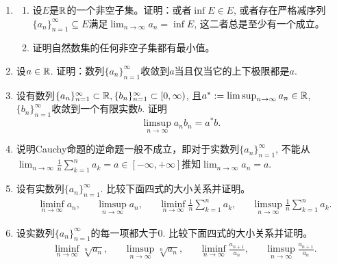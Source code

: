 \begin{enumerate}
    \item \begin{enumerate}
        \item 设$E$是$\mathbb{R}$的一个非空子集。证明：或者$\inf E\in E$, 或者存在严格减序列$\{a_n\}_{n=1}^\infty\subseteq E$满足$\lim_{n\to\infty}a_n=\inf E$, 这二者总是至少有一个成立。
        \item 证明自然数集的任何非空子集都有最小值。
    \end{enumerate}
    \item 设$a\in \mathbb{R}$. 证明：数列$\{a_n\}_{n=1}^\infty$收敛到$a$当且仅当它的上下极限都是$a$.
    \item 设有数列$\{a_n\}_{n=1}^\infty\subset \mathbb{R},\{b_n\}_{n=1}^\infty\subset [0,\infty)$, 且$a^*:=\limsup_{n\to \infty}a_n\in \mathbb{R}$, $\{b_n\}_{n=1}^\infty$收敛到一个有限实数$b$. 证明\begin{equation*}
        \limsup_{n\to\infty} a_nb_n=a^*b.
    \end{equation*}
    \item 说明Cauchy命题的逆命题一般不成立，即对于实数列$\{a_n\}_{n=1}^\infty$, 不能从$\lim_{n\to\infty}\frac{1}{n}\sum_{k=1}^{n}a_k=a\in [-\infty,+\infty]$推知$\lim_{n\to\infty}a_n=a$.
    \item 设有实数列$\{a_n\}_{n=1}^\infty$. 比较下面四式的大小关系并证明。\begin{align*}
        &\liminf_{n\to\infty}a_n,
        &&\limsup_{n\to\infty}a_n,
        &&\liminf_{n\to\infty}\frac{1}{n}\sum_{k=1}^{n}a_k,
        &&\limsup_{n\to\infty}\frac{1}{n}\sum_{k=1}^{n}a_k.
    \end{align*}
    \item 设实数列$\{a_n\}_{n=1}^{\infty}$的每一项都大于0. 比较下面四式的大小关系并证明。\begin{align*}
        &\liminf_{n\to\infty}\sqrt[n]{a_n},&&\limsup_{n\to\infty}\sqrt[n]{a_n},&&\liminf_{n\to\infty}\frac{a_{n+1}}{a_n},&&\limsup_{n\to\infty}\frac{a_{n+1}}{a_n}.
    \end{align*}
\end{enumerate}